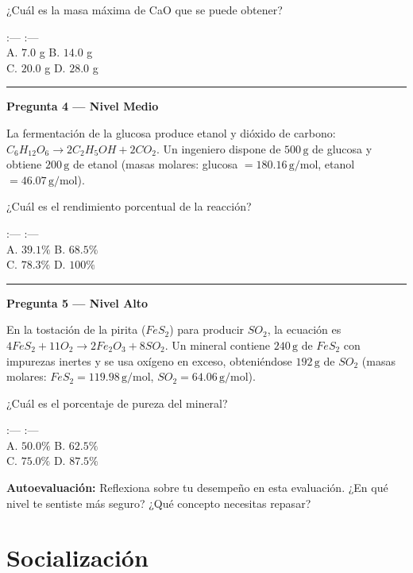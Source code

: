 \documentclass[
  spanish,
  letterpaper,
  12pt,
  oneside,
  open=any]{scrbook}
\newcommand{\setcolorsection}[2]{%
  \definecolor{currentsectionbg}{HTML}{#1}%
  \definecolor{currentsectionborder}{HTML}{#2}%
}
\begin{document}
¿Cuál es la masa máxima de CaO que se puede obtener?

:--- \textbar{} :--- \textbar{}\\
A. \(7.0\) g \textbar{} B. \(14.0\) g \textbar{}\\
C. \(20.0\) g \textbar{} D. \(28.0\) g \textbar{}

\begin{center}\rule{0.5\linewidth}{0.5pt}\end{center}

\textbf{Pregunta 4 --- Nivel Medio}

La fermentación de la glucosa produce etanol y dióxido de carbono:
\(C_6H_{12}O_6 \rightarrow 2C_2H_5OH + 2CO_2\). Un ingeniero dispone de
\(500\,\text{g}\) de glucosa y obtiene \(200\,\text{g}\) de etanol
(masas molares: glucosa \(= 180.16\,\text{g/mol}\), etanol
\(= 46.07\,\text{g/mol}\)).

¿Cuál es el rendimiento porcentual de la reacción?

:--- \textbar{} :--- \textbar{}\\
A. \(39.1\%\) \textbar{} B. \(68.5\%\) \textbar{}\\
C. \(78.3\%\) \textbar{} D. \(100\%\) \textbar{}

\begin{center}\rule{0.5\linewidth}{0.5pt}\end{center}

\textbf{Pregunta 5 --- Nivel Alto}

En la tostación de la pirita (\(FeS_2\)) para producir \(SO_2\), la
ecuación es \(4FeS_2 + 11O_2 \rightarrow 2Fe_2O_3 + 8SO_2\). Un mineral
contiene \(240\,\text{g}\) de \(FeS_2\) con impurezas inertes y se usa
oxígeno en exceso, obteniéndose \(192\,\text{g}\) de \(SO_2\) (masas
molares: \(FeS_2 = 119.98\,\text{g/mol}\),
\(SO_2 = 64.06\,\text{g/mol}\)).

¿Cuál es el porcentaje de pureza del mineral?

:--- \textbar{} :--- \textbar{}\\
A. \(50.0\%\) \textbar{} B. \(62.5\%\) \textbar{}\\
C. \(75.0\%\) \textbar{} D. \(87.5\%\) \textbar{}

\textbf{Autoevaluación:} Reflexiona sobre tu desempeño en esta
evaluación. ¿En qué nivel te sentiste más seguro? ¿Qué concepto
necesitas repasar?

\setcolorsection{f0c4b8}{dcb0a4}

\section{Socialización}\label{socializaciuxf3n}
\end{document}
